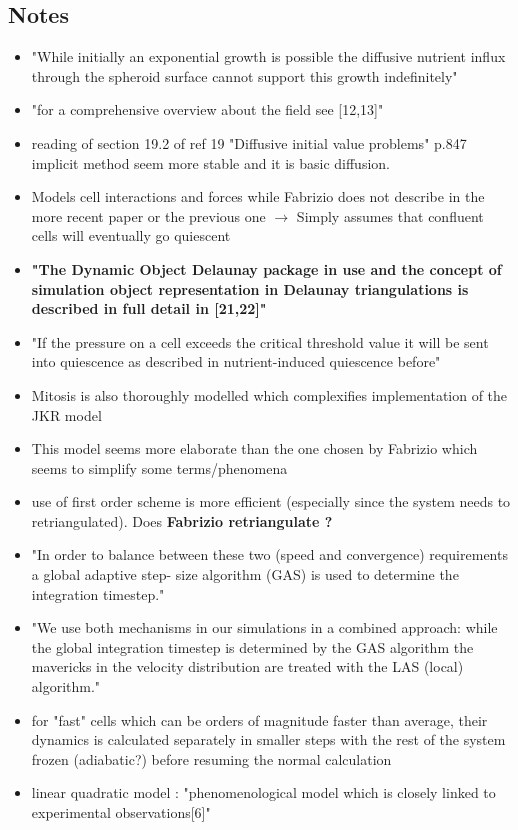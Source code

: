 \documentclass[11pt,a4paper]{article}
\begin{document}
\subsection*{Notes}
\begin{itemize}
\item "While initially an exponential growth is possible the diffusive nutrient influx through the spheroid surface cannot support this growth indefinitely"
\item "for a comprehensive overview about the field see [12,13]"
\item  reading of section 19.2 of ref 19 "Diffusive initial value problems" p.847 implicit method seem more stable and it is basic diffusion.
\item Models cell interactions and forces while Fabrizio does not describe in the more recent paper or the previous one $\rightarrow$  Simply assumes that confluent cells will eventually go quiescent
\item \textbf{"The Dynamic Object Delaunay package in use and the concept of simulation object representation in Delaunay triangulations is described in full detail in [21,22]"}
\item "If the pressure on a cell exceeds the critical threshold value it will be sent into quiescence as described in nutrient-induced quiescence before"
\item Mitosis is also thoroughly modelled which complexifies implementation of the JKR model
\item This model seems more elaborate than the one chosen by Fabrizio which seems to simplify some terms/phenomena
\item use of first order scheme is more efficient (especially since the system needs to retriangulated). Does \textbf{Fabrizio retriangulate ?}
\item "In order to balance between these two (speed and convergence) requirements a global adaptive step- size algorithm (GAS) is used to determine the integration timestep."
\item "We use both mechanisms in our simulations in a combined approach: while the global integration timestep is determined by the GAS algorithm the mavericks in the velocity distribution are treated with the LAS (local) algorithm."
\item for "fast" cells which can be orders of magnitude faster than average, their dynamics is calculated separately in smaller steps with the rest of the system frozen (adiabatic?) before resuming the normal calculation
\item linear quadratic model : "phenomenological model which is closely linked to experimental observations[6]" 

\end{itemize}
\end{document}
